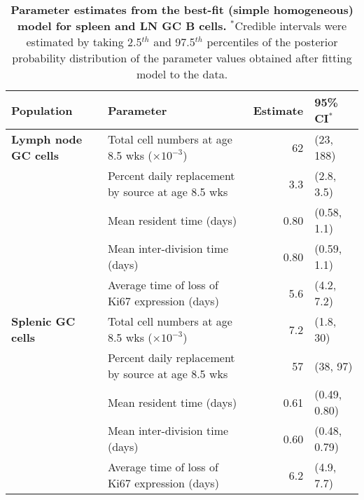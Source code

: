 \documentclass[11pt]{article}
\begin{document}
\begin{table}[h!]
	\begin{center}
		\renewcommand{\arraystretch}{1.25}
		\begin{tabular}{l l r l } 
			\toprule 
			\textbf{Population} & \textbf{Parameter}  &  {\small Estimate}  &  {\small 95\% CI$^{\ast}$} \\ 
			\toprule
			\textbf{Lymph node GC cells} & Total cell numbers at age 8.5 wks ($\times 10^{-3}$)     & 62      &  (23, 188)    \\ 
			& Percent daily replacement by source at age 8.5 wks                                    & 3.3     &  (2.8, 3.5)   \\
			& Mean resident time (days)                                                             & 0.80    &  (0.58, 1.1)  \\ 
			& Mean inter-division time (days)                                                       & 0.80    &  (0.59, 1.1)  \\ 	
			& Average time of loss of Ki67 expression (days)                                        & 5.6     &  (4.2, 7.2)  \\		
			\textbf{Splenic GC cells} & Total cell numbers at age 8.5 wks ($\times 10^{-3}$)        & 7.2     &  (1.8, 30)    \\ 
			& Percent daily replacement by source at age 8.5 wks                                    & 57      &  (38, 97)   \\
			& Mean resident time (days)                                                             & 0.61    &  (0.49, 0.80)  \\ 
			& Mean inter-division time (days)                                                       & 0.60    &  (0.48, 0.79)  \\ 	
			& Average time of loss of Ki67 expression (days)                                        & 6.2     &  (4.9, 7.7)  \\		
			\hline
			\toprule 
		\end{tabular}
	\end{center}
	\caption{\small \textbf{Parameter estimates from the best-fit (simple homogeneous) model for spleen and LN GC B cells.}  $^{\ast}$Credible intervals were estimated by taking 2.5$^{th}$ and 97.5$^{th}$ percentiles of the posterior probability distribution of the parameter values obtained after fitting model to the data.}
	\label{tab:GC-parestm}
\end{table} \
\end{document}
